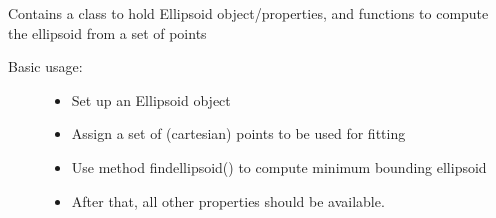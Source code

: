 \documentclass[a4paper,10pt,openany, oneside]{sphinxmanual}
\begin{document}
Contains a class to hold Ellipsoid object/properties, and functions to compute
the ellipsoid from a set of points
\begin{description}
\item[{Basic usage:}] \leavevmode\begin{itemize}
\item {} 
Set up an Ellipsoid object

\item {} 
Assign a set of (cartesian) points to be used for fitting

\item {} 
Use method findellipsoid() to compute minimum bounding ellipsoid

\item {} 
After that, all other properties should be available.

\end{itemize}

\end{description}
\end{document}
